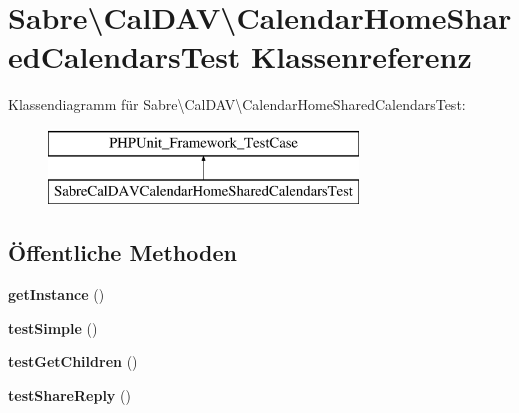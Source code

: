 \hypertarget{class_sabre_1_1_cal_d_a_v_1_1_calendar_home_shared_calendars_test}{}\section{Sabre\textbackslash{}Cal\+D\+AV\textbackslash{}Calendar\+Home\+Shared\+Calendars\+Test Klassenreferenz}
\label{class_sabre_1_1_cal_d_a_v_1_1_calendar_home_shared_calendars_test}
Klassendiagramm für Sabre\textbackslash{}Cal\+D\+AV\textbackslash{}Calendar\+Home\+Shared\+Calendars\+Test\+:\begin{figure}[H]
\begin{center}
\leavevmode
\includegraphics[height=2.000000cm]{class_sabre_1_1_cal_d_a_v_1_1_calendar_home_shared_calendars_test}
\end{center}
\end{figure}
\subsection*{Öffentliche Methoden}
\begin{DoxyCompactItemize}
\item 
\mbox{\label{class_sabre_1_1_cal_d_a_v_1_1_calendar_home_shared_calendars_test_a1f0b958de3906e5f6cdd3b8f4a4129c5}} 
{\bfseries get\+Instance} ()
\item 
\mbox{\label{class_sabre_1_1_cal_d_a_v_1_1_calendar_home_shared_calendars_test_a346b21529fbc67f5dd9c58a07c1c519c}} 
{\bfseries test\+Simple} ()
\item 
\mbox{\label{class_sabre_1_1_cal_d_a_v_1_1_calendar_home_shared_calendars_test_a97f6910d16ee0f8ea9380fc65a289bd8}} 
{\bfseries test\+Get\+Children} ()
\item 
\mbox{\label{class_sabre_1_1_cal_d_a_v_1_1_calendar_home_shared_calendars_test_a1c6854c37087a38e1e05a6e41eb157ac}} 
{\bfseries test\+Share\+Reply} ()
\end{DoxyCompactItemize}
